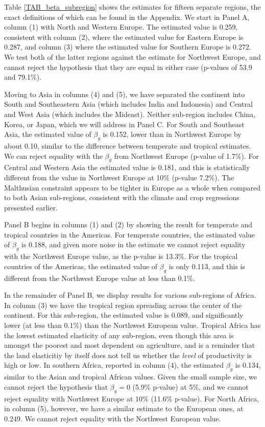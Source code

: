 \documentclass[11pt]{article}
\begin{document}
Table \ref{TAB_beta_subregion} shows the estimates for fifteen separate regions, the exact definitions of which can be found in the Appendix. We start in Panel A, column (1) with North and Western Europe. The estimated value is 0.259, consistent with column (2), where the estimated value for Eastern Europe is 0.287, and column (3) where the estimated value for Southern Europe is 0.272. We test both of the latter regions against the estimate for Northwest Europe, and cannot reject the hypothesis that they are equal in either case (p-values of 53.9 and 79.1\%). 

Moving to Asia in columns (4) and (5), we have separated the continent into South and Southeastern Asia (which includes India and Indonesia) and Central and West Asia (which includes the Mideast). Neither sub-region includes China, Korea, or Japan, which we will address in Panel C. For South and Southeast Asia, the estimated value of $\beta_g$ is 0.152, lower than in Northwest Europe by about 0.10, similar to the difference between temperate and tropical estimates. We can reject equality with the $\beta_g$ from Northwest Europe (p-value of 1.7\%). For Central and Western Asia the estimated value is 0.181, and this is statistically different from the value in Northwest Europe at 10\% (p-value 7.2\%). The Malthusian constraint appears to be tighter in Europe as a whole when compared to both Asian sub-regions, consistent with the climate and crop regressions presented earlier.

Panel B begins in columns (1) and (2) by showing the result for temperate and tropical countries in the Americas. For temperate countries, the estimated value of $\beta_g$ is 0.188, and given more noise in the estimate we cannot reject equality with the Northwest Europe value, as the p-value is 13.3\%. For the tropical countries of the Americas, the estimated value of $\beta_g$ is only 0.113, and this is different from the Northwest Europe value at less than 0.1\%.

In the remainder of Panel B, we display results for various sub-regions of Africa. In column (3) we have the tropical region spreading across the center of the continent. For this sub-region, the estimated value is 0.089, and significantly lower (at less than 0.1\%) than the Northwest European value. Tropical Africa has the lowest estimated elasticity of any sub-region, even though this area is amongst the poorest and most dependent on agriculture, and is a reminder that the land elasticitiy by itself does not tell us whether the \textit{level} of productivity is high or low. In southern Africa, reported in column (4), the estimated $\beta_g$ is 0.134, similar to the Asian and tropical African values. Given the small sample size, we cannot reject the hypothesis that $\beta_g=0$ (5.9\% p-value) at 5\%, and we cannot reject equality with Northwest Europe at 10\% (11.6\% p-value). For North Africa, in column (5), however, we have a similar estimate to the European ones, at 0.249. We cannot reject equality with the Northwest European value.
\end{document}
